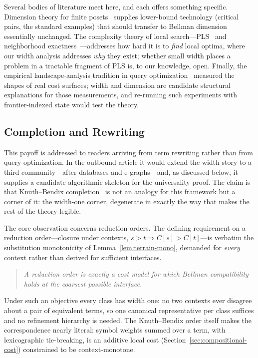 \documentclass[sigconf,nonacm]{acmart}
\theoremstyle{definition}
\theoremstyle{plain}
\theoremstyle{remark}
\begin{document}
Several bodies of literature meet here, and each offers something
specific.  Dimension theory for finite posets~\cite{trotter1992}
supplies lower-bound technology (critical pairs, the standard
examples) that should transfer to Bellman dimension essentially
unchanged.  The complexity theory of local
search---PLS~\cite{johnson1988easy} and neighborhood
exactness~\cite{papadimitriou1982combinatorial}---addresses how hard
it is to \emph{find} local optima, where our width analysis
addresses \emph{why} they exist; whether small width places a
problem in a tractable fragment of PLS is, to our knowledge, open.
Finally, the empirical landscape-analysis tradition in query
optimization~\cite{ioannidis1991left} measured the shapes of real
cost surfaces; width and dimension are candidate structural
explanations for those measurements, and re-running such experiments
with frontier-indexed state would test the theory.

\subsection{Completion and Rewriting}
\label{sec:completion}

This payoff is addressed to readers arriving from term rewriting
rather than from query optimization.  In the outbound article it
would extend the width story to a third community---after databases
and e-graphs---and, as discussed below, it supplies a candidate
algorithmic skeleton for the universality proof.  The claim is that
Knuth--Bendix completion~\cite{knuthbendix1970,baadernipkow1998} is
not an analogy for this framework but a corner of it: the width-one
corner, degenerate in exactly the way that makes the rest of the
theory legible.

The core observation concerns reduction orders.  The defining
requirement on a reduction order---closure under contexts,
$s>t\Rightarrow C[s]>C[t]$---is verbatim the substitution
monotonicity of Lemma~\ref{lem:terrain-mono}, demanded for
\emph{every} context rather than derived for sufficient interfaces.

\begin{quote}
\emph{A reduction order is exactly a cost model for which Bellman
compatibility holds at the coarsest possible interface.}
\end{quote}

Under such an objective every class has width one: no two contexts
ever disagree about a pair of equivalent terms, so one canonical
representative per class suffices and no refinement hierarchy is
needed.  The Knuth--Bendix order itself makes the correspondence
nearly literal: symbol weights summed over a term, with
lexicographic tie-breaking, is an additive local cost
(Section~\ref{sec:compositional-cost}) constrained to be
context-monotone.
\end{document}
